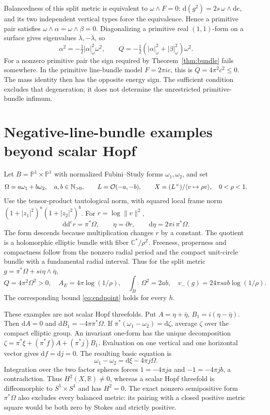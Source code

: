 \documentclass[11pt]{article}
\newcommand{\ddc}{\mathrm d\mathrm d^c}
\newcommand{\CP}{\mathbb P}
\begin{document}
Balancedness of this split metric is equivalent to \(\omega\wedge F=0\):
\(\mathrm d(g^2)=2s\,\omega\wedge\mathrm de\), and its two independent
vertical types force the equivalence. Hence a primitive pair satisfies
\(\omega\wedge\alpha=\omega\wedge\beta=0\). Diagonalizing a primitive
real \((1,1)\)-form on a surface gives eigenvalues \(\lambda,-\lambda\),
so
\[
 \alpha^2=-\tfrac12|\alpha|_\omega^2\omega^2,\qquad
 Q=-\tfrac12(|\alpha|_\omega^2+|\beta|_\omega^2)\omega^2.
\]
For a nonzero primitive pair the sign required by
Theorem~\ref{thm:bundle} fails somewhere. In the primitive line-bundle
model \(F=2\pi i c\), this is \(Q=4\pi^2c^2\le0\).
The mass identity then has the opposite energy sign. The sufficient
condition excludes that degeneration; it does not determine the
unrestricted primitive-bundle infimum.

\section{Negative-line-bundle examples beyond scalar Hopf}

Let \(B=\CP^1\times\CP^1\) with normalized Fubini--Study forms
\(\omega_1,\omega_2\), and set
\[
 \Omega=a\omega_1+b\omega_2,\quad a,b\in\mathbb N_{>0},\qquad
 L={\cal O}(-a,-b),\qquad
 X=(L^\times)/\langle v\mapsto\rho v\rangle,\quad0<\rho<1.
\]
Use the tensor-product tautological norm, with squared local frame norm
\((1+|z_1|^2)^a(1+|z_2|^2)^b\). For
\(r=\log\|v\|^2\),
\[
 \ddc r=\pi^*\Omega,\qquad\eta=\partial r,\qquad
 \mathrm d\eta=2\pi i\,\pi^*\Omega.
\]
The form descends because multiplication changes \(r\) by a constant.
The quotient is a holomorphic elliptic bundle with fiber
\(\mathbb C^*/\rho^{\mathbb Z}\). Freeness, properness and compactness
follow from the nonzero radial period and the compact unit-circle bundle
with a fundamental radial interval. Thus
for the split metric \(g=\pi^*\Omega+s i\eta\wedge\bar\eta\),
\[
 Q=4\pi^2\Omega^2>0,\quad
 A_E=4\pi\log(1/\rho),\quad \int_B\Omega^2=2ab,\quad
 v_-(g)=24\pi s ab\log(1/\rho).
\]
The corresponding bound \eqref{eq:endpoint} holds for every \(h\).

These examples are not scalar Hopf threefolds. Put
\(A=\eta+\bar\eta\), \(B_1=i(\eta-\bar\eta)\).
Then \(\mathrm dA=0\) and
\(\mathrm dB_1=-4\pi\pi^*\Omega\).
If \(\pi^*(\omega_1-\omega_2)=\mathrm d\zeta\), average \(\zeta\)
over the compact elliptic group. An invariant one-form has the unique
decomposition
\(\zeta=\pi^*\xi+(\pi^*f)A+(\pi^*j)B_1\).
Evaluation on one vertical and one horizontal vector gives
\(\mathrm df=\mathrm dj=0\). The resulting basic equation is
\[
 \omega_1-\omega_2=\mathrm d\xi-4\pi j\Omega.
\]
Integration over the two factor spheres forces
\(1=-4\pi ja\) and \(-1=-4\pi jb\), a contradiction.
Thus \(H^2(X,\mathbb R)\ne0\), whereas a scalar Hopf threefold is
diffeomorphic to \(S^5\times S^1\) and has \(H^2=0\).
The exact nonzero semipositive form \(\pi^*\Omega\) also excludes every
balanced metric: its pairing with a closed positive metric square would
be both zero by Stokes and strictly positive.
\end{document}
